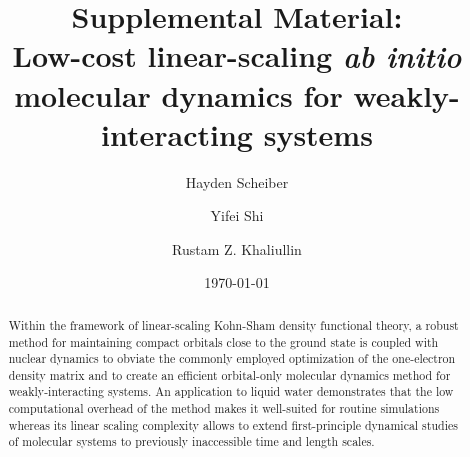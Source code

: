 \documentclass[aps,prl,reprint,amsmath,amssymb]{revtex4-1}
\newcommand*{\MAINTEXT}{}
\begin{document}
\ifdefined\MAINTEXT
\else
	\clearpage
	\setcounter{figure}{0}
	\setcounter{page}{1}
	\renewcommand{\thefigure}{S\arabic{figure}}
\fi

\title{
\ifdefined\MAINTEXT
\else
Supplemental Material: \\
\fi
Low-cost linear-scaling \emph{ab initio} molecular dynamics for weakly-interacting systems
}

\author{Hayden Scheiber}
\author{Yifei Shi}
\author{Rustam Z. Khaliullin}

\date{\today}

\ifdefined\MAINTEXT

\begin{abstract}
Within the framework of linear-scaling Kohn-Sham density functional theory, a robust method for maintaining compact orbitals close to the ground state is coupled with nuclear dynamics to obviate the commonly employed optimization of the one-electron density matrix and to create an efficient orbital-only molecular dynamics method for weakly-interacting systems. 
An application to liquid water demonstrates that the low computational overhead of the method makes it well-suited for routine simulations whereas its linear scaling complexity allows to extend first-principle dynamical studies of molecular systems to previously inaccessible time and length scales. 
\end{abstract}

\fi

\maketitle
\end{document}
